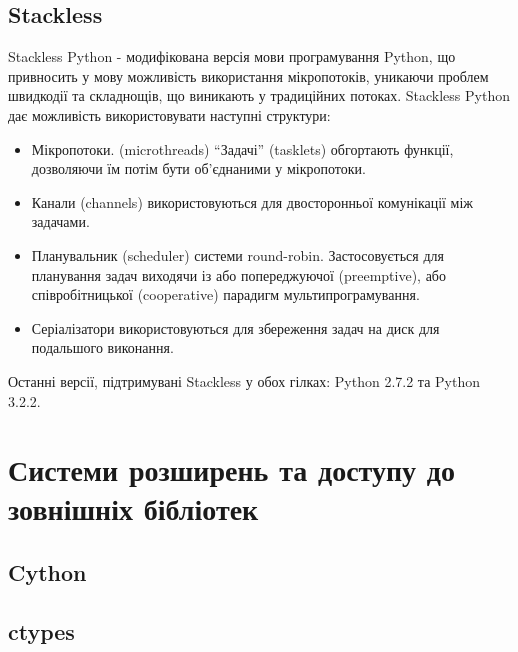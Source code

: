 \documentclass[a4paper, 12pt, onsedie]{article}
\begin{document}
\subsection{Stackless}
Stackless Python - модифікована версія мови програмування Python, що привносить у мову
можливість використання мікропотоків, уникаючи проблем швидкодії та складнощів, що виникають
у традиційних потоках. Stackless Python дає можливість використовувати наступні структури:
\begin{itemize}
    \item Мікропотоки. (microthreads) ``Задачі'' (tasklets) обгортають функції, дозволяючи їм 
          потім бути об'єднаними у мікропотоки.
    \item Канали (channels) використовуються для двосторонньої комунікації між задачами.
    \item Планувальник (scheduler) системи round-robin. Застосовується для планування
          задач виходячи із або попереджуючої (preemptive), або співробітницької (cooperative) 
          парадигм мультипрограмування.
    \item Серіалізатори використовуються для збереження задач на диск для подальшого виконання.
\end{itemize}

Останні версії, підтримувані Stackless у обох гілках: Python 2.7.2 та Python 3.2.2.

\section{Системи розширень та доступу до зовнішніх бібліотек}

\subsection{Cython}

\subsection{ctypes}
\end{document}
